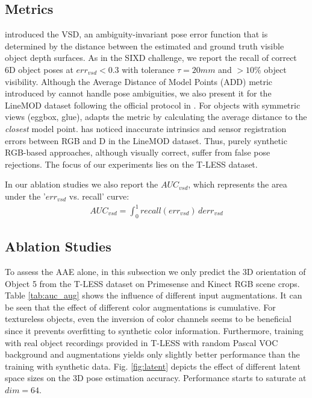 {{\begin{table}
	\end{table}



\subsection{Metrics}

\cite{hodan2016evaluation}  introduced the \gls{VSD}, an ambiguity-invariant pose error function that is determined by the distance between the estimated and ground truth visible object depth surfaces. As in the SIXD challenge, we report the recall of correct 6D object poses at $err_{vsd} < 0.3$ with tolerance $\tau = 20mm$ and $>10\%$ object visibility. Although the Average Distance of Model Points (ADD) metric introduced by \cite{hinterstoisser2012model} cannot handle pose ambiguities, we also present it for the LineMOD dataset following the official protocol in \cite{hinterstoisser2012model}. For objects with symmetric views (eggbox, glue), \cite{hinterstoisser2012model} adapts the metric by calculating the average distance to the \textit{closest} model point. \cite{Manhardt_2018_ECCV} has noticed inaccurate intrinsics and sensor registration errors between RGB and D in the LineMOD dataset. Thus, purely synthetic RGB-based approaches, although visually correct, suffer from false pose rejections. The focus of our experiments lies on the T-LESS dataset.

 In our ablation studies we also report the $AUC_{vsd}$, which represents the area under the '$err_{vsd}$ vs. recall' curve: 
\begin{align}
AUC_{vsd} = \int_0^1recall(err_{vsd})\,derr_{vsd}
\end{align}

	\subsection{Ablation Studies}
	To assess the \gls{AAE} alone, in this subsection we only predict the 3D orientation of Object 5 from the T-LESS dataset on Primesense and Kinect RGB scene crops. 
	Table \ref{tab:auc_aug} shows the influence of different input augmentations. 
	It can be seen that the effect of different color augmentations is cumulative. For textureless objects, even the inversion of color channels seems to be beneficial since it prevents overfitting to synthetic color information. Furthermore, training with real object recordings provided in T-LESS with random Pascal VOC background and augmentations yields only slightly better performance than the training with synthetic data.
	Fig. \ref{fig:latent} depicts the effect of different latent space sizes on the 3D pose estimation accuracy. Performance starts to saturate at $dim = 64$. 
	

}}
